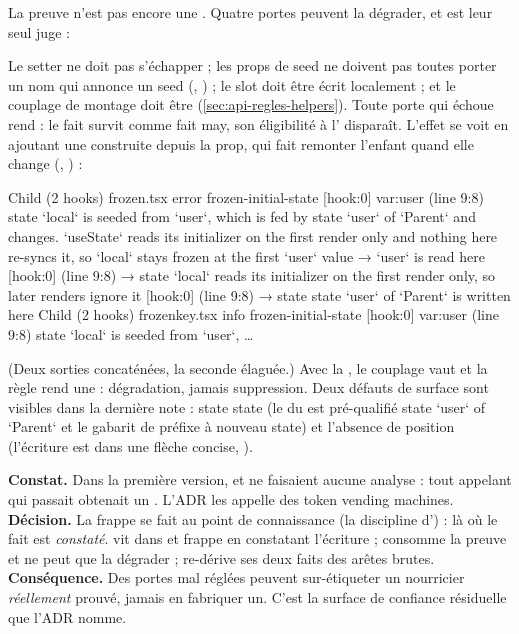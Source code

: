 La preuve n'est pas encore une \Error. Quatre portes peuvent la dégrader, et  est leur seul juge :


Le setter ne doit pas s'échapper ; les props de seed ne doivent pas toutes porter un nom qui annonce un seed (, ) ; le slot doit être écrit localement ; et le couplage de montage doit être  (\cref{sec:api-regles-helpers}). Toute porte qui échoue rend  : le fait survit comme fait may, son éligibilité à l'\Error{} disparaît. L'effet se voit en ajoutant une  construite depuis la prop, qui fait remonter l'enfant quand elle change (, ) :

\begin{sortie}
  Child  (2 hooks)  frozen.tsx
    error  frozen-initial-state  [hook:0]  var:user  (line 9:8)  state `local` is seeded from `user`, which is fed by state `user` of `Parent` and changes. `useState` reads its initializer on the first render only and nothing here re-syncs it, so `local` stays frozen at the first `user` value
       → `user` is read here [hook:0] (line 9:8)
       → state `local` reads its initializer on the first render only, so later renders ignore it [hook:0] (line 9:8)
       → state state `user` of `Parent` is written here
  Child  (2 hooks)  frozenkey.tsx
    info   frozen-initial-state  [hook:0]  var:user  (line 9:8)  state `local` is seeded from `user`, …
\end{sortie}

(Deux sorties concaténées, la seconde élaguée.) Avec la , le couplage vaut  et la règle rend une \Info{} : dégradation, jamais suppression. Deux défauts de surface sont visibles dans la dernière note : \og state state\fg{} (le  du  est pré-qualifié \og state `user` of `Parent`\fg{} et le gabarit de  préfixe à nouveau \og state\fg) et l'absence de position (l'écriture est dans une flèche concise, ).

\begin{decision}
\textbf{Constat.} Dans la première version,  et  ne faisaient aucune analyse : tout appelant qui passait  obtenait un . L'ADR les appelle des \og token vending machines\fg.
\textbf{Décision.} La frappe se fait \og au point de connaissance\fg{} (la discipline d') : là où le fait est \emph{constaté}.  vit dans  et frappe en constatant l'écriture ;  consomme la preuve et ne peut que la dégrader ;  re-dérive ses deux faits des arêtes brutes.
\textbf{Conséquence.} Des portes mal réglées peuvent sur-étiqueter un nourricier \emph{réellement} prouvé, jamais en fabriquer un. C'est la surface de confiance résiduelle que l'ADR nomme.
\end{decision}

